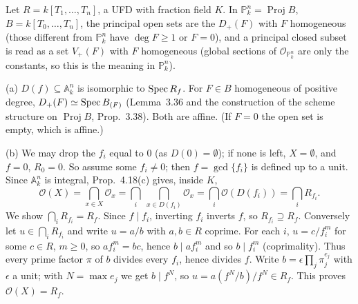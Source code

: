 \documentclass[11pt]{article}
\begin{document}
\pf
Let $R=k[T_1,\dots,T_n]$, a UFD with fraction field $K$. In $\mathbb P^n_k=\operatorname{Proj}B$, $B=k[T_0,\dots,T_n]$, the principal open sets are the $D_+(F)$ with $F$ homogeneous (those different from $\mathbb P^n_k$ have $\deg F\ge1$ or $F=0$), and a principal closed subset is read as a set $V_+(F)$ with $F$ homogeneous (global sections of $\mathcal O_{\mathbb P^n_k}$ are only the constants, so this is the meaning in $\mathbb P^n_k$).

(a) $D(f)\subseteq\mathbb A^n_k$ is isomorphic to $\operatorname{Spec} R_f$. For $F\in B$ homogeneous of positive degree, $D_+(F)\simeq\operatorname{Spec} B_{(F)}$ (Lemma~3.36 and the construction of the scheme structure on $\operatorname{Proj}B$, Prop.~3.38). Both are affine. (If $F=0$ the open set is empty, which is affine.)

(b) We may drop the $f_i$ equal to $0$ (as $D(0)=\emptyset$); if none is left, $X=\emptyset$, and $f=0$, $R_0=0$. So assume some $f_i\ne0$; then $f=\gcd\{f_i\}$ is defined up to a unit. Since $\mathbb A^n_k$ is integral, Prop.~4.18(c) gives, inside $K$,
\[ \mathcal O(X)=\bigcap_{x\in X}\mathcal O_{x}=\bigcap_i\ \bigcap_{x\in D(f_i)}\mathcal O_x=\bigcap_i\mathcal O(D(f_i))=\bigcap_iR_{f_i}. \]
We show $\bigcap_iR_{f_i}=R_f$. Since $f\mid f_i$, inverting $f_i$ inverts $f$, so $R_{f_i}\supseteq R_f$. Conversely let $u\in\bigcap_iR_{f_i}$ and write $u=a/b$ with $a,b\in R$ coprime. For each $i$, $u=c/f_i^m$ for some $c\in R$, $m\ge0$, so $af_i^m=bc$, hence $b\mid af_i^m$ and so $b\mid f_i^m$ (coprimality). Thus every prime factor $\pi$ of $b$ divides every $f_i$, hence divides $f$. Write $b=\epsilon\prod_j\pi_j^{e_j}$ with $\epsilon$ a unit; with $N=\max e_j$ we get $b\mid f^N$, so $u=a(f^N/b)/f^N\in R_f$. This proves $\mathcal O(X)=R_f$.
\end{document}
